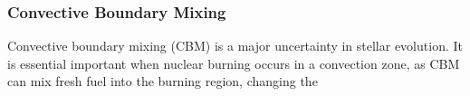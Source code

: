 {\color{purple}
\subsubsection{Convective Boundary Mixing}
}


Convective boundary mixing (CBM) is a major uncertainty in stellar evolution. It is essential important when nuclear burning occurs in a convection zone, as CBM can mix fresh fuel into the burning region, changing the 

